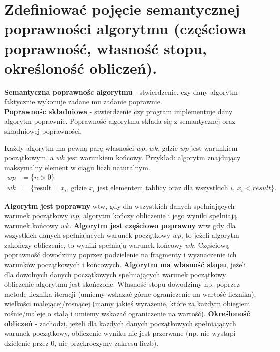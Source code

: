 \section{Zdefiniować pojęcie semantycznej poprawności algorytmu (częściowa poprawność, własność stopu, określoność obliczeń).}

\textbf{Semantyczna poprawnośc algorytmu} -
stwierdzenie, czy dany algorytm faktycznie wykonuje zadane mu zadanie poprawnie. \\
\textbf{Poprawnośc składniowa} - stwierdzenie czy program implementuje dany algorytm poprawnie.
Poprawność algorytmu składa się z semantycznej oraz składniowej poprawności.

Każdy algorytm ma pewną parę własności $wp$, $wk$, gdzie $wp$ jest warunkiem początkowym, a $wk$ jest warunkiem końcowy.
Przykład: algorytm znajdujący maksymalny element w ciągu liczb naturalnym.
\begin{align*}
    wp & = \{n > 0\} \\
    wk & = \{\text{result} = x_i\text{, gdzie }x_i\text{ jest elementem tablicy oraz dla wszystkich }i\text{, }x_i < result\}.
\end{align*}

\textbf{Algorytm jest poprawny} wtw, gdy dla wszystkich danych spełniających warunek początkowy $wp$,
algorytm kończy obliczenie i jego wyniki spełniają warunek końcowy $wk$.
\textbf{Algorytm jest częściowo poprawny} wtw gdy dla wszystkich danych spełniających warunek początkowy $wp$,
to jeżeli algorytm zakończy obliczenie, to wyniki spełniają warunek końcowy $wk$.
Częściową poprawność dowodzimy poprzez podzielenie na fragmenty i wyznaczenie ich warunków początkowych i końcowych.
\textbf{Algorytm ma własność stopu},
jeżeli dla dowolnych danych początkowych spełniających warunek początkowy obliczenie algorytmu jest skończone.
Własność stopu dowodzimy np. poprzez metodę licznika iteracji (umiemy wskazać górne ograniczenie na wartość licznika),
wielkości malejącej/rosnącej
(mamy jakieś wyrażenie, które za każdym obiegiem rośnie/maleje o stałą i umiemy wskazać ograniczenie na wartość).
\textbf{Określoność obliczeń} - zachodzi, jeżeli dla każdych danych początkowych spełniających warunek początkowy,
obliczenie wyniku nie jest przerwane (np. nie wystąpi dzielenie przez 0, nie przekroczymy zakresu liczb).
